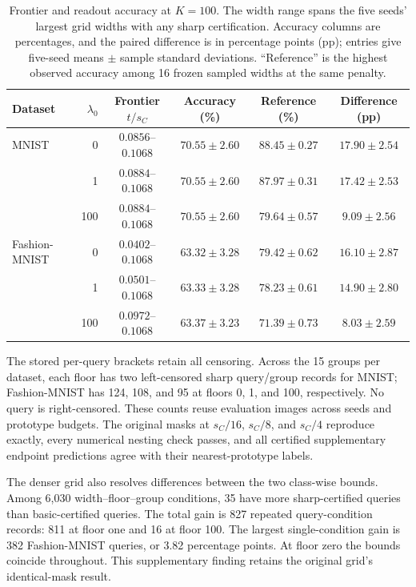 \begin{table}[!htbp]
\centering\small
\caption{Frontier and readout accuracy at $K=100$. The width range spans the five seeds' largest grid widths with any sharp certification. Accuracy columns are percentages, and the paired difference is in percentage points (pp); entries give five-seed means $\pm$ sample standard deviations. ``Reference'' is the highest observed accuracy among 16 frozen sampled widths at the same penalty.}
\label{tab:frontier}
\begin{tabular}{@{}lrcccc@{}}
\toprule
Dataset & $\lambda_0$ & Frontier $t/s_C$ & Accuracy (\%) & Reference (\%) & Difference (pp) \\
\midrule
MNIST & 0 & $0.0856$--$0.1068$ & $70.55\pm2.60$ & $88.45\pm0.27$ & $17.90\pm2.54$ \\
 & 1 & $0.0884$--$0.1068$ & $70.55\pm2.60$ & $87.97\pm0.31$ & $17.42\pm2.53$ \\
 & 100 & $0.0884$--$0.1068$ & $70.55\pm2.60$ & $79.64\pm0.57$ & $9.09\pm2.56$ \\
Fashion-MNIST & 0 & $0.0402$--$0.1068$ & $63.32\pm3.28$ & $79.42\pm0.62$ & $16.10\pm2.87$ \\
 & 1 & $0.0501$--$0.1068$ & $63.33\pm3.28$ & $78.23\pm0.61$ & $14.90\pm2.80$ \\
 & 100 & $0.0972$--$0.1068$ & $63.37\pm3.23$ & $71.39\pm0.73$ & $8.03\pm2.59$ \\
\bottomrule
\end{tabular}
\end{table}

The stored per-query brackets retain all censoring. Across the 15 groups per dataset, each floor has two left-censored sharp query/group records for MNIST; Fashion-MNIST has 124, 108, and 95 at floors 0, 1, and 100, respectively. No query is right-censored. These counts reuse evaluation images across seeds and prototype budgets. The original masks at $s_C/16$, $s_C/8$, and $s_C/4$ reproduce exactly, every numerical nesting check passes, and all certified supplementary endpoint predictions agree with their nearest-prototype labels.

The denser grid also resolves differences between the two class-wise bounds. Among 6,030 width--floor--group conditions, 35 have more sharp-certified queries than basic-certified queries. The total gain is 827 repeated query-condition records: 811 at floor one and 16 at floor 100. The largest single-condition gain is 382 Fashion-MNIST queries, or 3.82 percentage points. At floor zero the bounds coincide throughout. This supplementary finding retains the original grid's identical-mask result.

